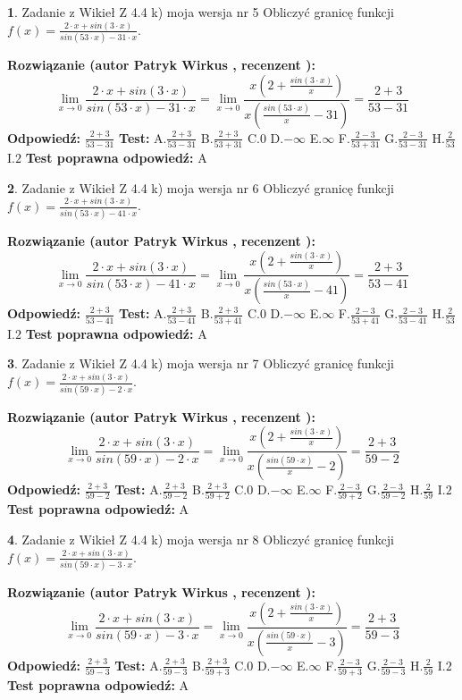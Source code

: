 \documentclass[12pt, a4paper]{article}
\theoremstyle{definition} %
\newtheorem{zad}{}
\newcommand{\zadStart}[1]{\begin{zad}#1\newline}
\newcommand{\zadStop}{\end{zad}}
\newcommand{\rozwStart}[2]{\noindent \textbf{Rozwiązanie (autor #1 , recenzent #2): }\newline}
\newcommand{\rozwStop}{\newline}
\newcommand{\odpStart}{\noindent \textbf{Odpowiedź:}\newline}
\newcommand{\odpStop}{\newline}
\newcommand{\testStart}{\noindent \textbf{Test:}\newline}
\newcommand{\testStop}{\newline}
\newcommand{\kluczStart}{\noindent \textbf{Test poprawna odpowiedź:}\newline}
\newcommand{\kluczStop}{\newline}
\begin{document}
\zadStart{Zadanie z Wikieł Z 4.4 k) moja wersja nr 5}
Obliczyć granicę funkcji $f(x)=\frac{2\cdot x +sin(3\cdot x)}{sin(53\cdot x) -31\cdot x}$.
\zadStop
\rozwStart{Patryk Wirkus}{}
$$\lim\limits_{x\to 0}\frac{2\cdot x +sin(3\cdot x)}{sin(53\cdot x) -31\cdot x}
=\lim\limits_{x\to 0}\frac{x(2+\frac{sin(3\cdot x)}{x})}{x(\frac{sin(53\cdot x)}{x}-31)}
=\frac{2+3}{53-31}$$
\rozwStop
\odpStart
$\frac{2+3}{53-31}$
\odpStop
\testStart
A.$\frac{2+3}{53-31}$
B.$\frac{2+3}{53+31}$
C.$0$
D.$-\infty$
E.$\infty$
F.$\frac{2-3}{53+31}$
G.$\frac{2-3}{53-31}$
H.$\frac{2}{53}$
I.$2$
\testStop
\kluczStart
A
\kluczStop



\zadStart{Zadanie z Wikieł Z 4.4 k) moja wersja nr 6}
Obliczyć granicę funkcji $f(x)=\frac{2\cdot x +sin(3\cdot x)}{sin(53\cdot x) -41\cdot x}$.
\zadStop
\rozwStart{Patryk Wirkus}{}
$$\lim\limits_{x\to 0}\frac{2\cdot x +sin(3\cdot x)}{sin(53\cdot x) -41\cdot x}
=\lim\limits_{x\to 0}\frac{x(2+\frac{sin(3\cdot x)}{x})}{x(\frac{sin(53\cdot x)}{x}-41)}
=\frac{2+3}{53-41}$$
\rozwStop
\odpStart
$\frac{2+3}{53-41}$
\odpStop
\testStart
A.$\frac{2+3}{53-41}$
B.$\frac{2+3}{53+41}$
C.$0$
D.$-\infty$
E.$\infty$
F.$\frac{2-3}{53+41}$
G.$\frac{2-3}{53-41}$
H.$\frac{2}{53}$
I.$2$
\testStop
\kluczStart
A
\kluczStop



\zadStart{Zadanie z Wikieł Z 4.4 k) moja wersja nr 7}
Obliczyć granicę funkcji $f(x)=\frac{2\cdot x +sin(3\cdot x)}{sin(59\cdot x) -2\cdot x}$.
\zadStop
\rozwStart{Patryk Wirkus}{}
$$\lim\limits_{x\to 0}\frac{2\cdot x +sin(3\cdot x)}{sin(59\cdot x) -2\cdot x}
=\lim\limits_{x\to 0}\frac{x(2+\frac{sin(3\cdot x)}{x})}{x(\frac{sin(59\cdot x)}{x}-2)}
=\frac{2+3}{59-2}$$
\rozwStop
\odpStart
$\frac{2+3}{59-2}$
\odpStop
\testStart
A.$\frac{2+3}{59-2}$
B.$\frac{2+3}{59+2}$
C.$0$
D.$-\infty$
E.$\infty$
F.$\frac{2-3}{59+2}$
G.$\frac{2-3}{59-2}$
H.$\frac{2}{59}$
I.$2$
\testStop
\kluczStart
A
\kluczStop



\zadStart{Zadanie z Wikieł Z 4.4 k) moja wersja nr 8}
Obliczyć granicę funkcji $f(x)=\frac{2\cdot x +sin(3\cdot x)}{sin(59\cdot x) -3\cdot x}$.
\zadStop
\rozwStart{Patryk Wirkus}{}
$$\lim\limits_{x\to 0}\frac{2\cdot x +sin(3\cdot x)}{sin(59\cdot x) -3\cdot x}
=\lim\limits_{x\to 0}\frac{x(2+\frac{sin(3\cdot x)}{x})}{x(\frac{sin(59\cdot x)}{x}-3)}
=\frac{2+3}{59-3}$$
\rozwStop
\odpStart
$\frac{2+3}{59-3}$
\odpStop
\testStart
A.$\frac{2+3}{59-3}$
B.$\frac{2+3}{59+3}$
C.$0$
D.$-\infty$
E.$\infty$
F.$\frac{2-3}{59+3}$
G.$\frac{2-3}{59-3}$
H.$\frac{2}{59}$
I.$2$
\testStop
\kluczStart
A
\kluczStop
\end{document}
